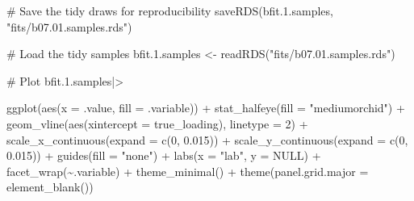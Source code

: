 \documentclass[
  letterpaper,
  DIV=11,
  numbers=noendperiod]{scrreprt}
\newenvironment{Shaded}{\begin{snugshade}}{\end{snugshade}}
\newcommand{\AttributeTok}[1]{\textcolor[rgb]{0.40,0.45,0.13}{#1}}
\newcommand{\CommentTok}[1]{\textcolor[rgb]{0.37,0.37,0.37}{#1}}
\newcommand{\ConstantTok}[1]{\textcolor[rgb]{0.56,0.35,0.01}{#1}}
\newcommand{\DecValTok}[1]{\textcolor[rgb]{0.68,0.00,0.00}{#1}}
\newcommand{\FloatTok}[1]{\textcolor[rgb]{0.68,0.00,0.00}{#1}}
\newcommand{\FunctionTok}[1]{\textcolor[rgb]{0.28,0.35,0.67}{#1}}
\newcommand{\NormalTok}[1]{\textcolor[rgb]{0.00,0.23,0.31}{#1}}
\newcommand{\OtherTok}[1]{\textcolor[rgb]{0.00,0.23,0.31}{#1}}
\newcommand{\SpecialCharTok}[1]{\textcolor[rgb]{0.37,0.37,0.37}{#1}}
\newcommand{\StringTok}[1]{\textcolor[rgb]{0.13,0.47,0.30}{#1}}
\begin{document}
\begin{Shaded}
\begin{Highlighting}[]
\CommentTok{\# Save the tidy draws for reproducibility}
\FunctionTok{saveRDS}\NormalTok{(bfit.}\FloatTok{1.}\NormalTok{samples, }\StringTok{"fits/b07.01.samples.rds"}\NormalTok{)}
\end{Highlighting}
\end{Shaded}

\begin{Shaded}
\begin{Highlighting}[]
\CommentTok{\# Load the tidy samples}
\NormalTok{bfit.}\FloatTok{1.}\NormalTok{samples }\OtherTok{\textless{}{-}} \FunctionTok{readRDS}\NormalTok{(}\StringTok{"fits/b07.01.samples.rds"}\NormalTok{)}

\CommentTok{\# Plot}
\NormalTok{bfit.}\FloatTok{1.}\NormalTok{samples}\SpecialCharTok{|\textgreater{}}

  \FunctionTok{ggplot}\NormalTok{(}\FunctionTok{aes}\NormalTok{(}\AttributeTok{x =}\NormalTok{ .value, }\AttributeTok{fill =}\NormalTok{ .variable)) }\SpecialCharTok{+}
    \FunctionTok{stat\_halfeye}\NormalTok{(}\AttributeTok{fill =} \StringTok{"mediumorchid"}\NormalTok{) }\SpecialCharTok{+}
    \FunctionTok{geom\_vline}\NormalTok{(}\FunctionTok{aes}\NormalTok{(}\AttributeTok{xintercept =}\NormalTok{ true\_loading), }\AttributeTok{linetype =} \DecValTok{2}\NormalTok{) }\SpecialCharTok{+} 
    \FunctionTok{scale\_x\_continuous}\NormalTok{(}\AttributeTok{expand =} \FunctionTok{c}\NormalTok{(}\DecValTok{0}\NormalTok{, }\FloatTok{0.015}\NormalTok{)) }\SpecialCharTok{+}
    \FunctionTok{scale\_y\_continuous}\NormalTok{(}\AttributeTok{expand =} \FunctionTok{c}\NormalTok{(}\DecValTok{0}\NormalTok{, }\FloatTok{0.015}\NormalTok{)) }\SpecialCharTok{+}
    \FunctionTok{guides}\NormalTok{(}\AttributeTok{fill =} \StringTok{"none"}\NormalTok{) }\SpecialCharTok{+}
    \FunctionTok{labs}\NormalTok{(}\AttributeTok{x =} \StringTok{"lab"}\NormalTok{,}
       \AttributeTok{y =} \ConstantTok{NULL}\NormalTok{)  }\SpecialCharTok{+}
    \FunctionTok{facet\_wrap}\NormalTok{(}\SpecialCharTok{\textasciitilde{}}\NormalTok{.variable) }\SpecialCharTok{+}
    \FunctionTok{theme\_minimal}\NormalTok{() }\SpecialCharTok{+} 
    \FunctionTok{theme}\NormalTok{(}\AttributeTok{panel.grid.major =} \FunctionTok{element\_blank}\NormalTok{())}
\end{Highlighting}
\end{Shaded}
\end{document}
